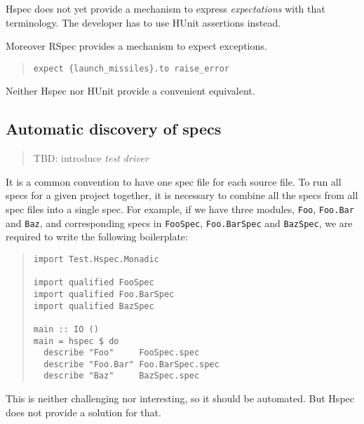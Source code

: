 \documentclass[preprint]{sigplanconf}
\begin{document}
\noindent Hspec does not yet provide a mechanism to express
\emph{expectations} with that terminology.  The developer has to use
HUnit assertions instead.

Moreover RSpec provides a mechanism to expect exceptions.

\begin{quote}
\small
\begin{verbatim}
expect {launch_missiles}.to raise_error
\end{verbatim}
\end{quote}

\noindent Neither Hspec nor HUnit provide a convenient equivalent.

\subsection{Automatic discovery of specs}
\label{sec:problem-discovery}

\begin{quote}
    TBD: introduce \emph{test driver}
\end{quote}

It is a common convention to have one spec file for each source file.
To run all specs for a given project together, it is necessary to
combine all the specs from all spec files into a single spec.  For
example, if we have three modules, \verb|Foo|, \verb|Foo.Bar| and
\verb|Baz|, and corresponding specs in \verb|FooSpec|,
\verb|Foo.BarSpec| and \verb|BazSpec|, we are required to write the
following boilerplate:

\begin{quote}
\small
\begin{verbatim}
import Test.Hspec.Monadic

import qualified FooSpec
import qualified Foo.BarSpec
import qualified BazSpec

main :: IO ()
main = hspec $ do
  describe "Foo"     FooSpec.spec
  describe "Foo.Bar" Foo.BarSpec.spec
  describe "Baz"     BazSpec.spec
\end{verbatim}
\end{quote}

\noindent This is neither challenging nor interesting, so it should be
automated.  But Hspec does not provide a solution for that.
\end{document}
